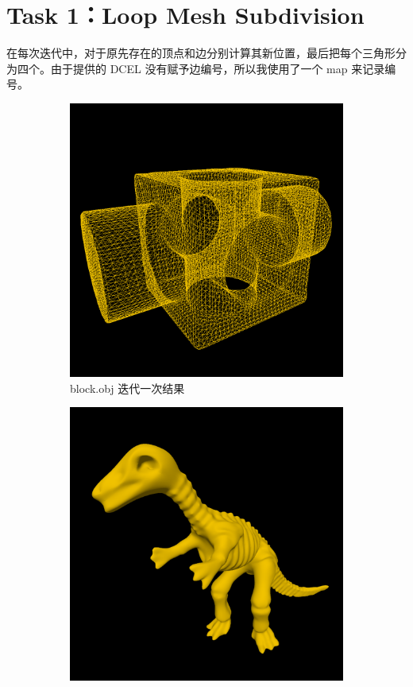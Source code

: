 \documentclass[UTF8]{ctexart}
\begin{document}
\section*{Task 1：Loop Mesh Subdivision}

在每次迭代中，对于原先存在的顶点和边分别计算其新位置，最后把每个三角形分为四个。由于提供的 DCEL 没有赋予边编号，所以我使用了一个 map 来记录编号。

\begin{figure}[h]
    \begin{subfigure}[b]{0.48\textwidth}
        \centering
        \includegraphics[height=0.3\textheight]{images/1-1.png}
        \caption{block.obj 迭代一次结果}
    \end{subfigure}
    \hfill
    \begin{subfigure}[b]{0.48\textwidth}
        \centering
        \includegraphics[height=0.3\textheight]{images/1-2.png}

\end{subfigure}
\end{figure}
\end{document}
